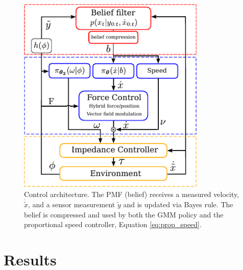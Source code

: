 \begin{figure}
  \centering
  \includegraphics[width=0.8\textwidth]{./ch4-PiH/Figures/control_flow_final.pdf}
  \caption{Control architecture. The PMF (belief) receives a measured velocity, $\dot{\tilde{x}}$, and 
  a sensor measurement $\tilde{y}$ and is updated via Bayes rule. The belief is compressed and used by both the GMM policy and the proportional speed controller, Equation \ref{eq:prop_speed}.}
  \label{fig:control_flow}
\end{figure}


\FloatBarrier
\section{Results}\label{ch4:results}

